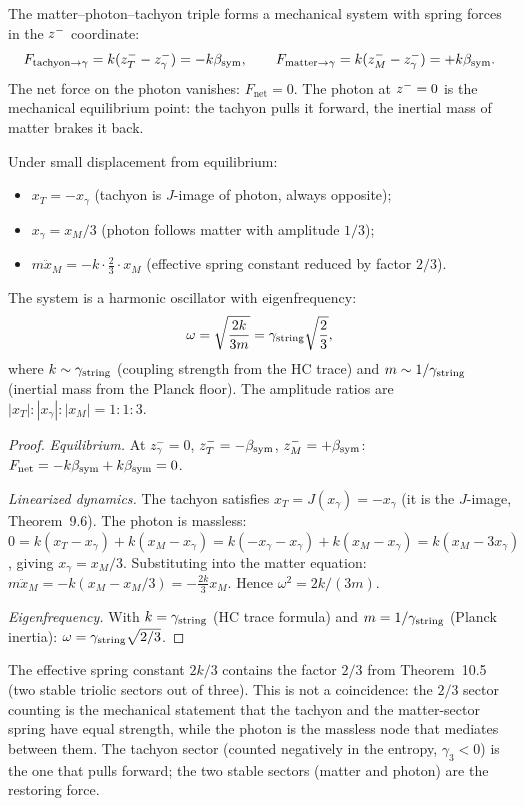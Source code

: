 \begin{theorem}
\label{thm:spring}
The matter--photon--tachyon triple forms a mechanical system with spring
forces in the $z^-$ coordinate:
\[
 F_{\mathrm{tachyon}\to\gamma} = k(z^-_T-z^-_\gamma) = -k\beta_{\mathrm{sym}},
 \qquad
 F_{\mathrm{matter}\to\gamma} = k(z^-_M-z^-_\gamma) = +k\beta_{\mathrm{sym}}.
\]
The net force on the photon vanishes: $F_{\mathrm{net}}=0$.
The photon at $z^-=0$ is the mechanical equilibrium point: the
tachyon pulls it forward, the inertial mass of matter brakes it back.

Under small displacement from equilibrium:
\begin{itemize}
 \item $x_T=-x_\gamma$ (tachyon is $J$-image of photon, always opposite);
 \item $x_\gamma=x_M/3$ (photon follows matter with amplitude $1/3$);
 \item $m\ddot x_M=-k\cdot\tfrac{2}{3}\cdot x_M$ (effective spring
 constant reduced by factor $2/3$).
\end{itemize}
The system is a harmonic oscillator with eigenfrequency:
\[
 \omega = \sqrt{\frac{2k}{3m}} = \gamma_{\mathrm{string}}\sqrt{\frac{2}{3}},
\]
where $k\sim\gamma_{\mathrm{string}}$ (coupling strength from the HC trace) and
$m\sim 1/\gamma_{\mathrm{string}}$ (inertial mass from the Planck floor).
The amplitude ratios are $|x_T|:|x_\gamma|:|x_M|=1:1:3$.
\begin{proof}
\emph{Equilibrium.}
At $z^-_\gamma=0$, $z^-_T=-\beta_{\mathrm{sym}}$, $z^-_M=+\beta_{\mathrm{sym}}$:
$F_{\mathrm{net}}=-k\beta_{\mathrm{sym}}+k\beta_{\mathrm{sym}}=0$.

\emph{Linearized dynamics.}
The tachyon satisfies $x_T=J(x_\gamma)=-x_\gamma$ (it is the $J$-image,
Theorem~9.6).
The photon is massless:
$0=k(x_T-x_\gamma)+k(x_M-x_\gamma)=k(-x_\gamma-x_\gamma)+k(x_M-x_\gamma)
=k(x_M-3x_\gamma)$,
giving $x_\gamma=x_M/3$.
Substituting into the matter equation:
$m\ddot x_M=-k(x_M-x_M/3)=-\tfrac{2k}{3}x_M$.
Hence $\omega^2=2k/(3m)$.

\emph{Eigenfrequency.}
With $k=\gamma_{\mathrm{string}}$ (HC trace formula) and $m=1/\gamma_{\mathrm{string}}$
(Planck inertia): $\omega=\gamma_{\mathrm{string}}\sqrt{2/3}$.
\end{proof}
\end{theorem}

\begin{remark}
The effective spring constant $2k/3$ contains the factor $2/3$ from
Theorem~10.5 (two stable triolic sectors out of three).
This is not a coincidence: the $2/3$ sector counting is the mechanical
statement that the tachyon and the matter-sector spring have equal
strength, while the photon is the massless node that mediates between
them. The tachyon sector (counted negatively in the entropy,
$\gamma_3<0$) is the one that pulls forward; the two stable sectors
(matter and photon) are the restoring force.
\end{remark}

